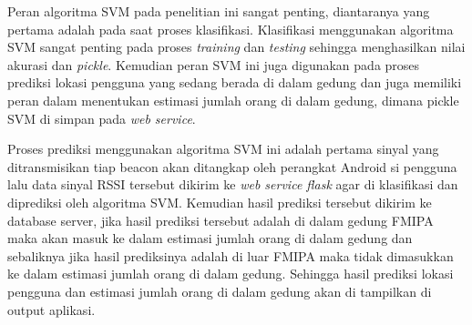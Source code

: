 \par Peran algoritma SVM pada penelitian ini sangat penting, diantaranya yang pertama adalah pada saat proses klasifikasi. Klasifikasi menggunakan algoritma SVM sangat penting pada proses \textit{training} dan \textit{testing} sehingga menghasilkan nilai akurasi dan \textit{pickle}. Kemudian peran SVM ini juga digunakan pada proses prediksi lokasi pengguna yang sedang berada di dalam gedung dan juga memiliki peran dalam menentukan estimasi jumlah orang di dalam gedung, dimana pickle SVM di simpan pada \textit{web service}.

\par Proses prediksi menggunakan algoritma SVM ini adalah pertama sinyal yang ditransmisikan tiap beacon akan ditangkap oleh perangkat Android si pengguna lalu data sinyal RSSI tersebut dikirim ke \textit{web service flask} agar di klasifikasi dan diprediksi oleh algoritma SVM. Kemudian hasil prediksi tersebut dikirim ke database server, jika hasil prediksi tersebut adalah di dalam gedung FMIPA maka akan masuk ke dalam estimasi jumlah orang di dalam gedung dan sebaliknya jika hasil prediksinya adalah di luar FMIPA maka tidak dimasukkan ke dalam estimasi jumlah orang di dalam gedung. Sehingga hasil prediksi lokasi pengguna dan estimasi jumlah orang di dalam gedung akan di tampilkan di output aplikasi.



